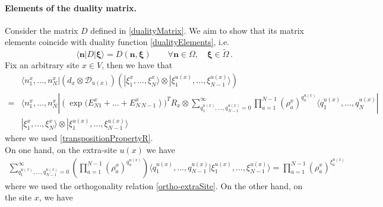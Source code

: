 \documentclass[10pt]{article}
\numberwithin{equation}{section}
\numberwithin{equation}{subsection}
\newcommand{\dd}{\mathcal{D}_{u(x)}}
\begin{document}
\paragraph{Elements of the duality matrix.}
Consider the matrix $D$ defined in \eqref{dualityMatrix}.
We aim to show that its matrix elements coincide with duality function \eqref{dualityElements}, i.e.
\begin{equation}\label{proofDualityElements}
\langle \bm{n}|D|\bm{\xi}\rangle=D(\bm{n},\bm{\xi})\qquad   \forall \bm{n}\in \Omega,\quad \bm{\xi}\in \widetilde{\Omega}\,.
\end{equation}
Fix an arbitrary site $x\in V$, then we have that 
\begin{align}
	 &\langle n^{x}_{1},\ldots,n_{N}^{x}|\left(d_{x}\otimes \dd\right)\left(|\xi_{1}^{x},\ldots,\xi_{N}^{x}\rangle\otimes|\xi_{1}^{u(x)},\ldots,\xi_{N-1}^{u(x)}\rangle\right)\nonumber\\=&\langle n_{1}^{x},\ldots,n_{N}^{x}| (\exp{(E_{N1}^{x}+\ldots+E_{N\,N-1}^{x}}))^{T}R_{x}\otimes\sum_{q_{1}^{u(x)},\ldots,q_{N-1}^{u(x)}=0}^{\infty}\prod_{a=1}^{N-1}\left(\rho_{a}^{x}\right)^{q_{a}^{u(x)}}\langle q_{1}^{u(x)},\ldots,q_{N}^{u(x)}|\nonumber
	 \\&|\xi_{1}^{x},\ldots,\xi_{N}^{x}\rangle \otimes |\xi_{1}^{u(x)},\ldots,\xi_{N-1}^{u(x)}\rangle
\end{align} 
where we used \eqref{transpositionPropertyR}. \\
On one hand, on the extra-site $u(x)$ we have 
\begin{align}
\sum_{q_{1}^{u(x)},\ldots,q_{N-1}^{u(x)}=0}^{\infty}\left(\prod_{a=1}^{N-1}\left(\rho_{a}^{x}\right)^{q_{a}^{u(x)}}\right)\langle q_{1}^{u(x)},\ldots,q_{N-1}^{u(x)}|\xi_{1}^{u(x)},\ldots,\xi_{N-1}^{u(x)}\rangle=\prod_{a=1}^{N-1}\left(\rho_{a}^{x}\right)^{\xi_{a}^{u(x)}}
\end{align}
{ 
where we used the orthogonality relation \eqref{ortho-extraSite}}. 
On the other hand, on the site $x$, we have 
\end{document}
